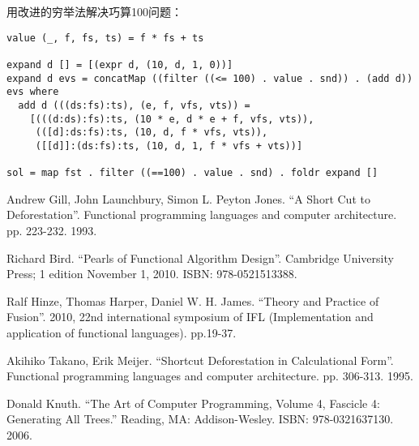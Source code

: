 \documentclass{article}
\begin{document}
用改进的穷举法解决巧算100问题：
\begin{lstlisting}
value (_, f, fs, ts) = f * fs + ts

expand d [] = [(expr d, (10, d, 1, 0))]
expand d evs = concatMap ((filter ((<= 100) . value . snd)) . (add d)) evs where
  add d (((ds:fs):ts), (e, f, vfs, vts)) =
    [(((d:ds):fs):ts, (10 * e, d * e + f, vfs, vts)),
     (([d]:ds:fs):ts, (10, d, f * vfs, vts)),
     ([[d]]:(ds:fs):ts, (10, d, 1, f * vfs + vts))]

sol = map fst . filter ((==100) . value . snd) . foldr expand []
\end{lstlisting}

\ifx\wholebook\relax \else
\begin{thebibliography}{99}

Andrew Gill, John Launchbury, Simon L. Peyton Jones. ``A Short Cut to Deforestation''. Functional programming languages and computer architecture. pp. 223-232. 1993.

Richard Bird. ``Pearls of Functional Algorithm Design''. Cambridge University Press; 1 edition November 1, 2010. ISBN: 978-0521513388.

Ralf Hinze, Thomas Harper, Daniel W. H. James. ``Theory and Practice of Fusion''. 2010, 22nd international symposium of IFL (Implementation and application of functional languages). pp.19-37.

Akihiko Takano, Erik Meijer. ``Shortcut Deforestation in Calculational Form''. Functional programming languages and computer architecture. pp. 306-313. 1995.

Donald Knuth. ``The Art of Computer Programming, Volume 4, Fascicle 4: Generating All Trees.'' Reading, MA: Addison-Wesley. ISBN: 978-0321637130. 2006.

\end{thebibliography}

\expandafter\enddocument

\fi
\end{document}
